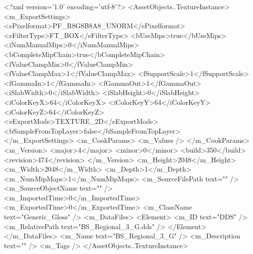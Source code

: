 <?xml version='1.0' encoding='utf-8'?>
<AssetObjects..TextureInstance>
  <m_ExportSettings>
    <ePixelformat>PF_R8G8B8A8_UNORM</ePixelformat>
    <eFilterType>FT_BOX</eFilterType>
    <bUseMips>true</bUseMips>
    <iNumManualMips>0</iNumManualMips>
    <bCompleteMipChain>true</bCompleteMipChain>
    <fValueClampMin>0</fValueClampMin>
    <fValueClampMax>1</fValueClampMax>
    <fSupportScale>1</fSupportScale>
    <fGammaIn>1</fGammaIn>
    <fGammaOut>1</fGammaOut>
    <iSlabWidth>0</iSlabWidth>
    <iSlabHeight>0</iSlabHeight>
    <iColorKeyX>64</iColorKeyX>
    <iColorKeyY>64</iColorKeyY>
    <iColorKeyZ>64</iColorKeyZ>
    <eExportMode>TEXTURE_2D</eExportMode>
    <bSampleFromTopLayer>false</bSampleFromTopLayer>
  </m_ExportSettings>
  <m_CookParams>
    <m_Values />
  </m_CookParams>
  <m_Version>
    <major>4</major>
    <minor>0</minor>
    <build>350</build>
    <revision>474</revision>
  </m_Version>
  <m_Height>2048</m_Height>
  <m_Width>2048</m_Width>
  <m_Depth>1</m_Depth>
  <m_NumMipMaps>1</m_NumMipMaps>
  <m_SourceFilePath text="" />
  <m_SourceObjectName text="" />
  <m_ImportedTime>0</m_ImportedTime>
  <m_ExportedTime>0</m_ExportedTime>
  <m_ClassName text="Generic_Gloss" />
  <m_DataFiles>
    <Element>
      <m_ID text="DDS" />
      <m_RelativePath text="BS_Regional_3_G.dds" />
    </Element>
  </m_DataFiles>
  <m_Name text="BS_Regional_3_G" />
  <m_Description text="" />
  <m_Tags />
</AssetObjects..TextureInstance>